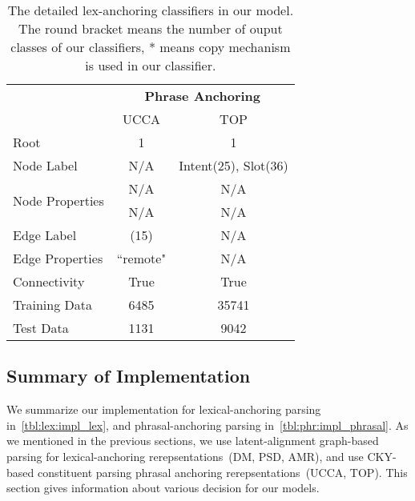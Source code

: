 \begin{table}[!tbp]
\caption{The detailed lex-anchoring classifiers in our model. The round bracket means the number of ouput classes of our classifiers, * means copy mechanism is
  used in our classifier.}
\label{tbl:phr:impl_phrasal}
\begin{center}
\begin{tabular}{l|cc}
\toprule
\hline
                                 & \multicolumn{2}{c}{{\bf Phrase Anchoring}} \\ \cline{2-3}
                                 & UCCA      & TOP                            \\ \hline
Root                             & 1         & 1                              \\ \hline
Node Label                       & N/A       & Intent(25), Slot(36)           \\ \hline
\multirow{2}{*}{Node Properties} & N/A       & N/A                            \\
                                 & N/A       & N/A                            \\ \hline
Edge Label                       & (15)      & N/A                            \\ \hline
Edge Properties                  & ``remote" & N/A                            \\ \hline
Connectivity                     & True      & True                           \\ \hline
Training Data                    & 6485      & 35741                          \\ \hline
Test Data                        & 1131      & 9042                           \\ \hline \bottomrule
\end{tabular}
\end{center}
\label{tbl:phr:impl_phrasal}
\end{table}

\subsection{Summary of Implementation}
\label{ssec:impl_summary}

We summarize our implementation for lexical-anchoring parsing
in~\autoref{tbl:lex:impl_lex}, and phrasal-anchoring parsing
in~\autoref{tbl:phr:impl_phrasal}. As we mentioned in the previous
sections, we use latent-alignment graph-based parsing for
lexical-anchoring rerepsentations~(DM, PSD, AMR), and use CKY-based
constituent parsing phrasal anchoring rerepsentations~(UCCA, TOP). This section
gives information about various decision for our models.

